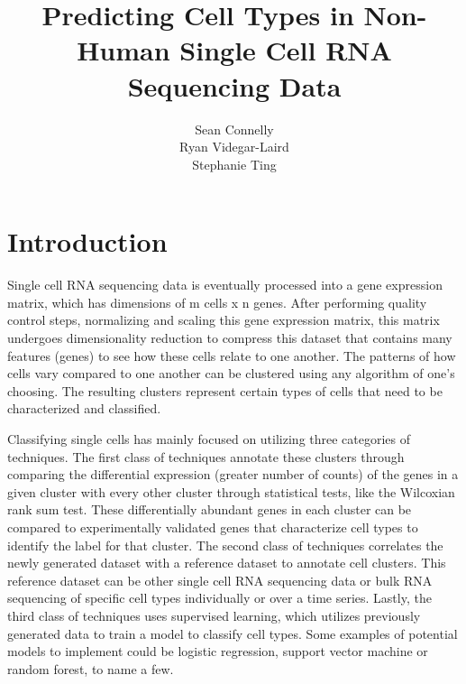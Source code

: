 \documentclass{article}
\title{Predicting Cell Types in Non-Human Single Cell RNA Sequencing Data}
\author{
  Sean Connelly \\
  \And
  Ryan Videgar-Laird \\
  \AND
  Stephanie Ting \\
}
\begin{document}
\maketitle

\section{Introduction}

Single cell RNA sequencing data is eventually processed into a gene expression matrix, which has dimensions of m cells x n genes. After performing quality control steps, normalizing and scaling this gene expression matrix, this matrix undergoes dimensionality reduction to compress this dataset that contains many features (genes) to see how these cells relate to one another. The patterns of how cells vary compared to one another can be clustered using any algorithm of one’s choosing. The resulting clusters represent certain types of cells that need to be characterized and classified.

Classifying single cells has mainly focused on utilizing three categories of techniques. The first class of techniques annotate these clusters through comparing the differential expression (greater number of counts) of the genes in a given cluster with every other cluster through statistical tests, like the Wilcoxian rank sum test. These differentially abundant genes in each cluster can be compared to experimentally validated genes that characterize cell types to identify the label for that cluster. The second class of techniques correlates the newly generated dataset with a reference dataset to annotate cell clusters. This reference dataset can be other single cell RNA sequencing data or bulk RNA sequencing of specific cell types individually or over a time series. Lastly, the third class of techniques uses supervised learning, which utilizes previously generated data to train a model to classify cell types. Some examples of potential models to implement could be logistic regression, support vector machine or random forest, to name a few.
\end{document}
